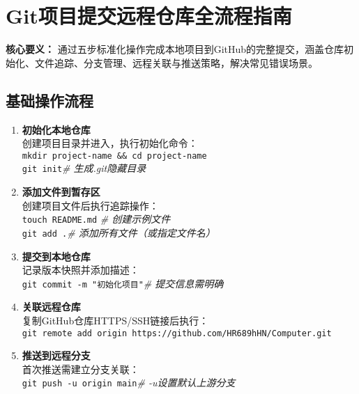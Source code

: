 \section{Git项目提交远程仓库全流程指南}
\textbf{核心要义：}
通过五步标准化操作完成本地项目到GitHub的完整提交，涵盖仓库初始化、文件追踪、分支管理、远程关联与推送策略，解决常见错误场景。

\subsection{基础操作流程}
\begin{enumerate}[leftmargin=*, nosep]
\item \textbf{初始化本地仓库}\\
创建项目目录并进入，执行初始化命令：\\
\texttt{mkdir project-name \&\& cd project-name} \\
\texttt{git init}\quad \textit{\# 生成.git隐藏目录}

\item \textbf{添加文件到暂存区}\\
创建项目文件后执行追踪操作：\\
\texttt{touch README.md} \quad \textit{\# 创建示例文件} \\
\texttt{git add .}\quad \textit{\# 添加所有文件（或指定文件名）}

\item \textbf{提交到本地仓库}\\
记录版本快照并添加描述：\\
\texttt{git commit -m "初始化项目"}\quad \textit{\# 提交信息需明确}

\item \textbf{关联远程仓库}\\
复制GitHub仓库HTTPS/SSH链接后执行：\\
\texttt{git remote add origin https://github.com/HR689hHN/Computer.git}

\item \textbf{推送到远程分支}\\
首次推送需建立分支关联：\\
\texttt{git push -u origin main}\quad \textit{\# -u设置默认上游分支}
\end{enumerate}

